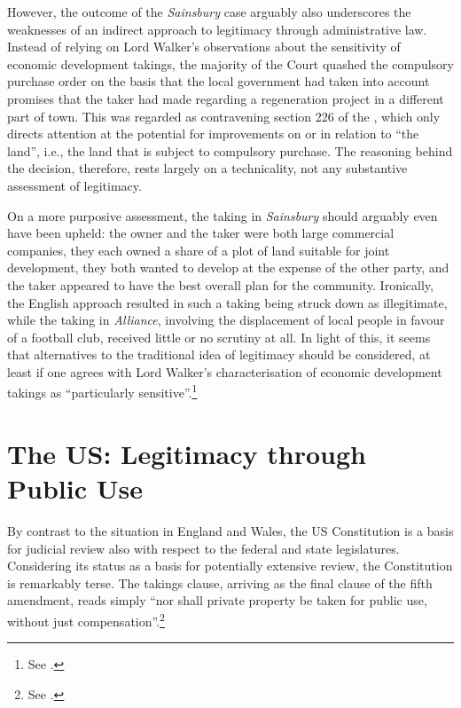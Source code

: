 However, the outcome of the {\it Sainsbury} case arguably also underscores the weaknesses of an indirect approach to legitimacy through administrative law. Instead of relying on Lord Walker's observations about the sensitivity of economic development takings, the majority of the Court quashed the compulsory purchase order on the basis that the local government had taken into account promises that the taker had made regarding a regeneration project in a different part of town. This was regarded as contravening section 226 of the \cite{tcpa90}, which only directs attention at the potential for improvements on or in relation to ``the land'', i.e., the land that is subject to compulsory purchase. The reasoning behind the decision, therefore, rests largely on a technicality, not any substantive assessment of legitimacy.

On a more purposive assessment, the taking in {\it Sainsbury} should arguably even have been upheld: the owner and the taker were both large commercial companies, they each owned a share of a plot of land suitable for joint development, they both wanted to develop at the expense of the other party, and the taker appeared to have the best overall plan for the community. Ironically, the English approach resulted in such a taking being struck down as illegitimate, while the taking in {\it Alliance}, involving the displacement of local people in favour of a football club, received little or no scrutiny at all. In light of this, it seems that alternatives to the traditional idea of legitimacy should be considered, at least if one agrees with Lord Walker's characterisation of economic development takings as ``particularly sensitive''.\footnote{See \cite[82]{sainsbury10}.}

\section{The US: Legitimacy through Public Use}\label{sec:3:3}

By contrast to the situation in England and Wales, the US Constitution is a basis for judicial review also with respect to the federal and state legislatures. Considering its status as a basis for potentially extensive review, the Constitution is remarkably terse. The takings clause, arriving as the final clause of the fifth amendment, reads simply ``nor shall private property be taken for public use, without just compensation''.\footnote{See \cite{us}.}


